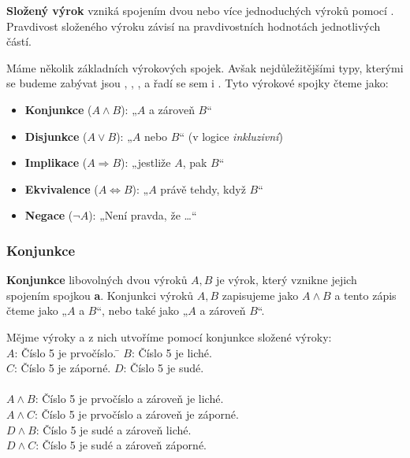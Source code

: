 \documentclass[12pt,a4paper]{article}
\begin{document}
\begin{definitionbox}
\textbf{Složený výrok} vzniká spojením dvou nebo více jednoduchých výroků pomocí .  
Pravdivost složeného výroku závisí na pravdivostních hodnotách jednotlivých částí.
\end{definitionbox}

\newpage

Máme několik základních výrokových spojek. Avšak nejdůležitějšími typy, kterými se budeme zabývat jsou
, , ,  a řadí se sem i .
Tyto výrokové spojky čteme jako:

\begin{itemize}
    \item \textbf{Konjunkce} ($A \land B$): „$A$ a zároveň $B$“
    \item \textbf{Disjunkce} ($A \lor B$): „$A$ nebo $B$“ (v logice \emph{inkluzivní})
    \item \textbf{Implikace} ($A \Rightarrow B$): „jestliže $A$, pak $B$“
    \item \textbf{Ekvivalence} ($A \Leftrightarrow B$): „$A$ právě tehdy, když $B$“
    \item \textbf{Negace} ($\neg A$): „Není pravda, že …“
\end{itemize}

\subsubsection*{Konjunkce}
\begin{definitionbox}
    \textbf{Konjunkce} libovolných dvou výroků $A, B$ je výrok, který vznikne jejich spojením spojkou \textbf{a}.
    Konjunkci výroků $A, B$ zapisujeme jako $A \land B$ a tento zápis čteme jako „$A$ a $B$“, nebo také jako „$A$ a zároveň $B$“.
\end{definitionbox}


\begin{examplebox}
\begin{tabbing}
    Mějme výroky a z nich utvoříme pomocí konjunkce složené výroky:\\
    $A$: Číslo 5 je prvočíslo. \=
    $B$: Číslo 5 je liché.\\
    $C$: Číslo 5 je záporné.\>
    $D$: Číslo 5 je sudé.\\
    \\
    $A \land B$: Číslo 5 je prvočíslo a zároveň je liché. \\
    $A \land C$: Číslo 5 je prvočíslo a zároveň je záporné.\\
    $D \land B$: Číslo 5 je sudé a zároveň liché.\\
    $D \land C$: Číslo 5 je sudé a zároveň záporné.
\end{tabbing}
\end{examplebox}
\end{document}
